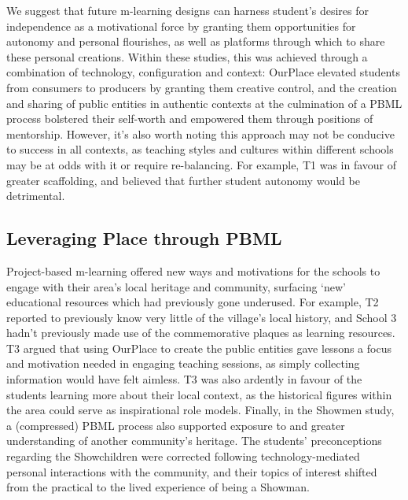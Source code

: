\documentclass[,hyphens]{sigchi}
\begin{document}
We suggest that future m-learning designs can harness student's desires for independence as a motivational force by granting them opportunities for autonomy and personal flourishes, as well as platforms through which to share these personal creations. Within these studies, this was achieved through a combination of technology, configuration and context: OurPlace elevated students from consumers to producers by granting them creative control, and the creation and sharing of public entities in authentic contexts at the culmination of a PBML process bolstered their self-worth and empowered them through positions of mentorship. However, it's also worth noting this approach may not be conducive to success in all contexts, as teaching styles and cultures within different schools may be at odds with it or require re-balancing. For example, T1 was in favour of greater scaffolding, and believed that further student autonomy would be detrimental. 

\subsection{Leveraging Place through PBML}
Project-based m-learning offered new ways and motivations for the schools to engage with their area's local heritage and community, surfacing `new' educational resources which had previously gone underused. For example, T2 reported to previously know very little of the village's local history, and School 3 hadn't previously made use of the commemorative plaques as learning resources. T3 argued that using OurPlace to create the public entities gave lessons a focus and motivation needed in engaging teaching sessions, as simply collecting information would have felt aimless. T3 was also ardently in favour of the students learning more about their local context, as the historical figures within the area could serve as inspirational role models. Finally, in the Showmen study, a (compressed) PBML process also supported exposure to and greater understanding of another community's heritage. The students' preconceptions regarding the Showchildren were corrected following technology-mediated personal interactions with the community, and their topics of interest shifted from the practical to the lived experience of being a Showman.
\end{document}
